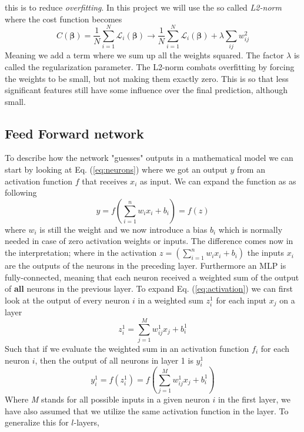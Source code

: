 \documentclass[14pt, a4paper]{book}
\begin{document}
this is to reduce \textit{overfitting}. In this project we will use the so called \textit{L2-norm} where the cost function becomes
\begin{equation}\label{eq:L2-reg}
    C(\bm\beta)=\frac{1}{N}\sum_{i=1}^N\mathcal{L}_i(\bm\beta)\rightarrow \frac{1}{N}\sum_{i=1}^N\mathcal{L}_i(\bm\beta)+\lambda\sum_{ij}w_{ij}^2
\end{equation}
Meaning we add a term where we sum up all the weights squared. The factor $\lambda$ is called the regularization parameter. The L2-norm combats overfitting by forcing the weights to be small, but not making them exactly zero. 
This is so that less significant features still have some influence over the final prediction, although small.


\subsection{Feed Forward network}
To describe how the network "guesses" outputs in a mathematical model we can start by looking at Eq. (\ref{eq:neurons}) where we got an output $y$ from an activation function $f$ that receives $x_i$ as input. 
We can expand the function as as following
\begin{equation}\label{eq:activation}
    y=f\left(\sum_{i=1}^nw_ix_i+b_i\right)=f(z)
\end{equation} 
where $w_i$ is still the weight and we now introduce a bias $b_i$ which is normally needed in case of zero activation weights or inputs. The difference comes now in the interpretation; where in the activation 
$z=(\sum_{i=1}^nw_ix_i+b_i)$ the inputs $x_i$ are the outputs of the neurons in the preceding layer. Furthermore an MLP is fully-connected, meaning that each neuron received a weighted sum of the output of \textbf{all} 
neurons in the previous layer. To expand Eq. (\ref{eq:activation}) we can first look at the output of every neuron $i$ in a weighted sum $z^1_i$ for each input $x_j$ on a layer
\begin{equation}\label{eq:weightedsum}
    z_i^1=\sum_{j=1}^Mw_{ij}^1x_j + b^1_i
\end{equation}
Such that if we evaluate the weighted sum in an activation function $f_i$ for each neuron $i$, then the output of all neurons in layer 1 is $y_i^1$
$$
    y^1_i=f(z_i^1)=f\left(\sum_{j=1}^Mw_{ij}^1x_j + b^1_i\right)
$$
Where \textit{M} stands for all possible inputs in a given neuron $i$ in the first layer, we have also assumed that we utilize the same activation function in the layer. To generalize this for $l$-layers, 
\end{document}
